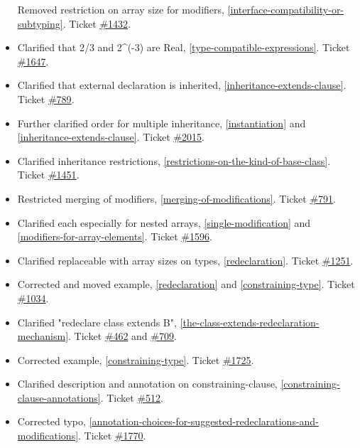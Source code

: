 \begin{itemize}
  Removed restriction on array size for modifiers, \ref{interface-compatibility-or-subtyping}. Ticket
  \href{https://trac.modelica.org/Modelica/ticket/1432}{\#1432}.
\item
  Clarified that 2/3 and 2\^{}(-3) are Real, \ref{type-compatible-expressions}. Ticket
  \href{https://trac.modelica.org/Modelica/ticket/1647}{\#1647}.
\item
  Clarified that external declaration is inherited, \ref{inheritance-extends-clause}. Ticket
  \href{https://trac.modelica.org/Modelica/ticket/789}{\#789}.
\item
  Further clarified order for multiple inheritance, \ref{instantiation} and
  \ref{inheritance-extends-clause}. Ticket
  \href{https://trac.modelica.org/Modelica/ticket/2015}{\#2015}.
\item
  Clarified inheritance restrictions, \ref{restrictions-on-the-kind-of-base-class}. Ticket
  \href{https://trac.modelica.org/Modelica/ticket/1451}{\#1451}.
\item
  Restricted merging of modifiers, \ref{merging-of-modifications}. Ticket
  \href{https://trac.modelica.org/Modelica/ticket/791}{\#791}.
\item
  Clarified each especially for nested arrays, \ref{single-modification} and \ref{modifiers-for-array-elements}.
  Ticket \href{https://trac.modelica.org/Modelica/ticket/1596}{\#1596}.
\item
  Clarified replaceable with array sizes on types, \ref{redeclaration}. Ticket
  \href{https://trac.modelica.org/Modelica/ticket/1251}{\#1251}.
\item
  Corrected and moved example, \ref{redeclaration} and \ref{constraining-type}. Ticket
  \href{https://trac.modelica.org/Modelica/ticket/1034}{\#1034}.
\item
  Clarified "redeclare class extends B", \ref{the-class-extends-redeclaration-mechanism}. Ticket
  \href{https://trac.modelica.org/Modelica/ticket/462}{\#462} and
  \href{https://trac.modelica.org/Modelica/ticket/709}{\#709}.
\item
  Corrected example, \ref{constraining-type}. Ticket
  \href{https://trac.modelica.org/Modelica/ticket/1725}{\#1725}.
\item
  Clarified description and annotation on constraining-clause, \ref{constraining-clause-annotations}. Ticket
  \href{https://trac.modelica.org/Modelica/ticket/512}{\#512}.
\item
  Corrected typo, \ref{annotation-choices-for-suggested-redeclarations-and-modifications}. Ticket
  \href{https://trac.modelica.org/Modelica/ticket/1770}{\#1770}.

\end{itemize}
